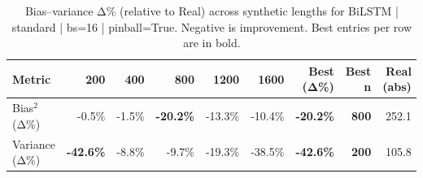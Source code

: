 \renewcommand{\arraystretch}{1.2}
\begin{table}[!t]
\centering
\footnotesize
\caption{Bias–variance Δ\% (relative to Real) across synthetic lengths for BiLSTM | standard | bs=16 | pinball=True. Negative is improvement. Best entries per row are in bold.}
\label{tab:bvdelta_BiLSTM_standard_bs16_pinballTrue}
\setlength{\tabcolsep}{5pt}
\begin{tabular}{lrrrrrrrr}
\toprule
Metric & 200 & 400 & 800 & 1200 & 1600 & Best (Δ\%) & Best n & Real (abs) \\
\midrule
Bias$^2$ (Δ\%) & -0.5\% & -1.5\% & \textbf{-20.2\%} & -13.3\% & -10.4\% & \textbf{-20.2\%} & \textbf{800} & 252.1 \\
Variance (Δ\%) & \textbf{-42.6\%} & -8.8\% & -9.7\% & -19.3\% & -38.5\% & \textbf{-42.6\%} & \textbf{200} & 105.8 \\
\bottomrule
\end{tabular}

\end{table}
